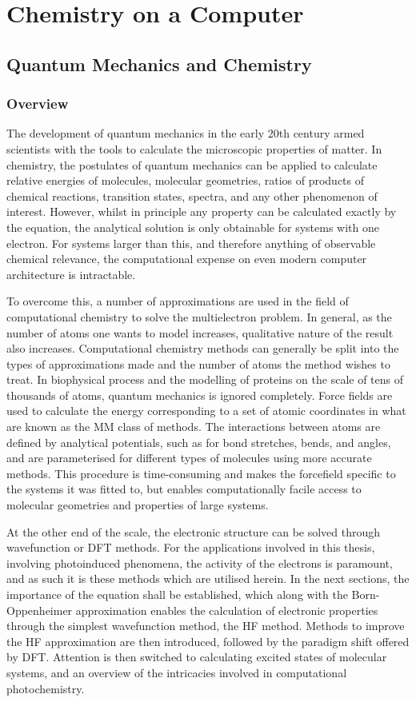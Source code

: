 \chapter{Chemistry on a Computer}
\label{chapter:theory}
\section{Quantum Mechanics and Chemistry}\label{section: QM}
\subsection{Overview}\label{section: QM_overview}
The development of quantum mechanics in the early 20th century armed scientists with the tools to calculate the microscopic properties of matter. In chemistry, the postulates of quantum mechanics can be applied to calculate relative energies of molecules, molecular geometries, ratios of products of chemical reactions, transition states, spectra, and any other phenomenon of interest. However, whilst in principle any property can be calculated exactly by the \schro{} equation, the analytical solution is only obtainable for systems with one electron. For systems larger than this, and therefore anything of observable chemical relevance, the computational expense on even modern computer architecture is intractable. 

To overcome this, a number of approximations are used in the field of computational chemistry to solve the multielectron problem. In general, as the number of atoms one wants to model increases, qualitative nature of the result also increases. Computational chemistry methods can generally be split into the types of approximations made and the number of atoms the method wishes to treat. In biophysical process and the modelling of proteins on the scale of tens of thousands of atoms, quantum mechanics is ignored completely. Force fields are used to calculate the energy corresponding to a set of atomic coordinates in what are known as the \ac{MM} class of methods. The interactions between atoms are defined by analytical potentials, such as for bond stretches, bends, and angles, and are parameterised for different types of molecules using more accurate methods. This procedure is time-consuming and makes the forcefield specific to the systems it was fitted to, but enables computationally facile access to molecular geometries and properties of large systems.\cite{Cramer2002}

At the other end of the scale, the electronic structure can be solved through wavefunction or \ac{DFT} methods. For the applications involved in this thesis, involving photoinduced phenomena, the activity of the electrons is paramount, and as such it is these methods which are utilised herein. In the next sections, the importance of the \schro{} equation shall be established, which along with the Born-Oppenheimer approximation enables the calculation of electronic properties through the simplest wavefunction method, the \ac{HF} method. Methods to improve the \ac{HF} approximation are then introduced, followed by the paradigm shift offered by \ac{DFT}. Attention is then switched to calculating excited states of molecular systems, and an overview of the intricacies involved in computational photochemistry.
